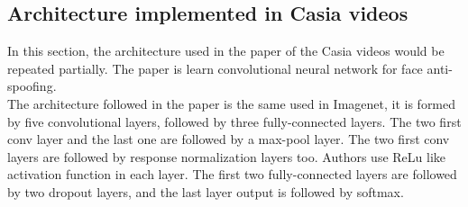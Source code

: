 




\clearpage

\subsection{Architecture implemented in Casia videos}
In this section, the architecture used in the paper of the Casia videos would be repeated partially. The paper is learn convolutional neural network for face anti-spoofing.\\

The architecture followed in the paper is the same used in Imagenet, it is formed by five convolutional layers, followed by three fully-connected layers. The two first conv layer and the last one are followed by a max-pool layer. The two first conv layers are followed by response normalization layers too. Authors use ReLu like activation function in each layer. The first two fully-connected layers are followed by two dropout layers, and the last layer output is followed by softmax.\\


